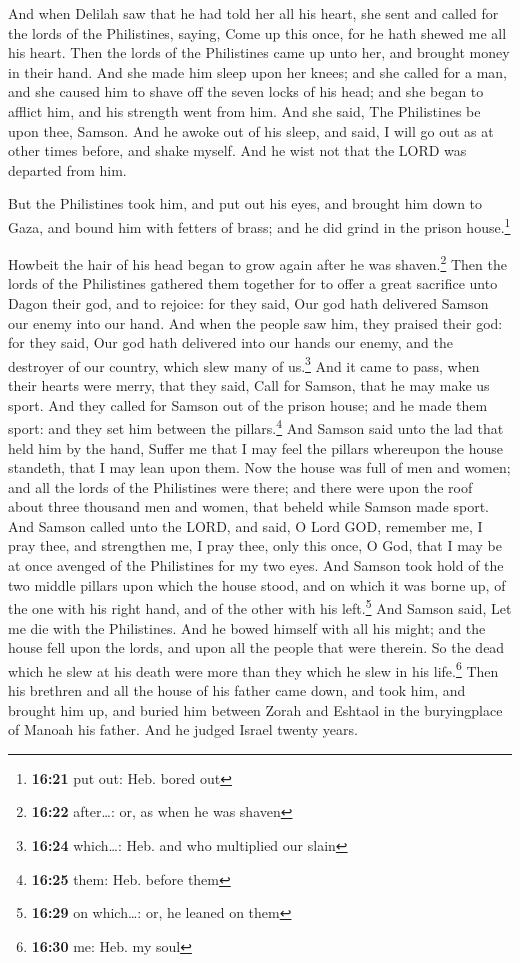  And when Delilah saw that he had told her all his heart,
she sent and called for the lords of the Philistines, saying, Come up
this once, for he hath shewed me all his heart. Then the lords of the
Philistines came up unto her, and brought money in their hand.
 And she made him sleep upon her knees; and she called
for a man, and she caused him to shave off the seven locks of his head;
and she began to afflict him, and his strength went from him.
 And she said, The Philistines be upon thee, Samson. And
he awoke out of his sleep, and said, I will go out as at other times
before, and shake myself. And he wist not that the LORD was departed
from him.

 But the Philistines took him, and put out his eyes, and
brought him down to Gaza, and bound him with fetters of brass; and he
did grind in the prison house.\footnote{\textbf{16:21} put out: Heb.
  bored out}

 Howbeit the hair of his head began to grow again after
he was shaven.\footnote{\textbf{16:22} after\ldots: or, as when he was
  shaven}  Then the lords of the Philistines gathered
them together for to offer a great sacrifice unto Dagon their god, and
to rejoice: for they said, Our god hath delivered Samson our enemy into
our hand.  And when the people saw him, they praised
their god: for they said, Our god hath delivered into our hands our
enemy, and the destroyer of our country, which slew many of
us.\footnote{\textbf{16:24} which\ldots: Heb. and who multiplied our
  slain}  And it came to pass, when their hearts were
merry, that they said, Call for Samson, that he may make us sport. And
they called for Samson out of the prison house; and he made them sport:
and they set him between the pillars.\footnote{\textbf{16:25} them: Heb.
  before them}  And Samson said unto the lad that held
him by the hand, Suffer me that I may feel the pillars whereupon the
house standeth, that I may lean upon them.  Now the house
was full of men and women; and all the lords of the Philistines were
there; and there were upon the roof about three thousand men and women,
that beheld while Samson made sport.  And Samson called
unto the LORD, and said, O Lord GOD, remember me, I pray thee, and
strengthen me, I pray thee, only this once, O God, that I may be at once
avenged of the Philistines for my two eyes.  And Samson
took hold of the two middle pillars upon which the house stood, and on
which it was borne up, of the one with his right hand, and of the other
with his left.\footnote{\textbf{16:29} on which\ldots: or, he leaned on
  them}  And Samson said, Let me die with the
Philistines. And he bowed himself with all his might; and the house fell
upon the lords, and upon all the people that were therein. So the dead
which he slew at his death were more than they which he slew in his
life.\footnote{\textbf{16:30} me: Heb. my soul}  Then his
brethren and all the house of his father came down, and took him, and
brought him up, and buried him between Zorah and Eshtaol in the
buryingplace of Manoah his father. And he judged Israel twenty years.

